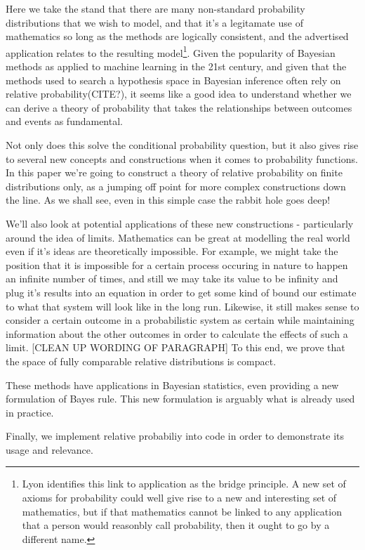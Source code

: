 \documentclass[twoside]{article}
\begin{document}
Here we take the stand that there are many non-standard probability distributions that we wish to model, and that it's a legitamate use of mathematics so long as the methods are logically consistent, and the advertised application relates to the resulting model\footnote{Lyon identifies this link to application as the bridge principle. A new set of axioms for probability could well give rise to a new and interesting set of mathematics, but if that mathematics cannot be linked to any application that a person would reasonbly call probability, then it ought to go by a different name.}. Given the popularity of Bayesian methods as applied to machine learning in the 21st century, and given that the methods used to search a hypothesis space in Bayesian inference often rely on relative probability(CITE?), it seems like a good idea to understand whether we can derive a theory of probability that takes the relationships between outcomes and events as fundamental.

Not only does this solve the conditional probability question, but it also gives rise to several new concepts and constructions when it comes to probability functions. In this paper we're going to construct a theory of relative probability on finite distributions only, as a jumping off point for more complex constructions down the line. As we shall see, even in this simple case the rabbit hole goes deep!

We'll also look at potential applications of these new constructions - particularly around the idea of limits. Mathematics can be great at modelling the real world even if it's ideas are theoretically impossible. For example, we might take the position that it is impossible for a certain process occuring in nature to happen an infinite number of times, and still we may take its value to be infinity and plug it's results into an equation in order to get some kind of bound our estimate to what that system will look like in the long run. Likewise, it still makes sense to consider a certain outcome in a probabilistic system as certain while maintaining information about the other outcomes in order to calculate the effects of such a limit. [CLEAN UP WORDING OF PARAGRAPH] To this end, we prove that the space of fully comparable relative distributions is compact.

These methods have applications in Bayesian statistics, even providing a new formulation of Bayes rule. This new formulation is arguably what is already used in practice.

Finally, we implement relative probabiliy into code in order to demonstrate its usage and relevance.
\end{document}
